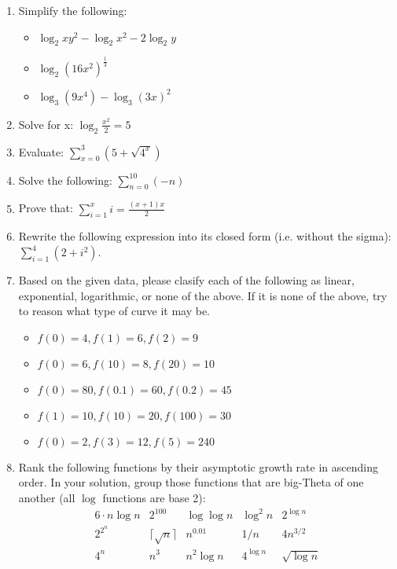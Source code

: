 \documentclass[11pt]{article}
\begin{document}
\begin{enumerate}[leftmargin=*]

\item Simplify the following: 
\begin{itemize}
    \item \( \log_2 xy^2 - \log_2 x^2 - 2 \log_2 y \)
    \item \( \log_2 (16x^2)^\frac{1}{3} \)
    \item \( \log_3(9x^4) - \log_3(3x)^2\)
\end{itemize}

\item Solve for x: \( \log_{2} \frac{x^2}{2} = 5 \)

\item Evaluate: \( \sum\limits_{x=0}^3 (5 + \sqrt{4^x}) \)

\item Solve the following: \( \sum\limits_{n=0}^{10} (-n) \)

\item Prove that: \( \sum\limits_{i=1}^{x} i = \frac{(x + 1)x}{2} \)

\item Rewrite the following expression into its closed form (i.e. without the sigma): \( \sum_{i=1}^4 (2 + i^2) \).

\item Based on the given data, please clasify each of the following as linear, exponential, logarithmic, or none of the above. If it is none of the above, try to reason what type of curve it may be.
\begin{itemize}
    \item $f(0) = 4, f(1) = 6, f(2) = 9$
    \item $f(0) = 6, f(10) = 8, f(20) = 10$
    \item $f(0) = 80, f(0.1) = 60, f(0.2) = 45$
    \item $f(1) = 10, f(10) = 20, f(100) = 30$
    \item $f(0) = 2, f(3) = 12, f(5) = 240$
\end{itemize}

\item Rank the following functions by their asymptotic growth rate in ascending order.  In your solution, group those functions that are big-Theta of one another (all $\log$ functions are base 2):
    \begin{equation*}
        \begin{array}{ccccc}
            6 \cdot n\log n & 2^{100} & \log \log n & \log^2 n & 2^{\log n} \\
            2^{2^n} & \lceil\sqrt{n}\rceil & n^{0.01} & 1/n & 4n^{3/2} \\
            4^n & n^3 & n^2\log n & 4^{\log n} & \sqrt{\log n} \\
        \end{array}
    \end{equation*}


\end{enumerate}
\end{document}
